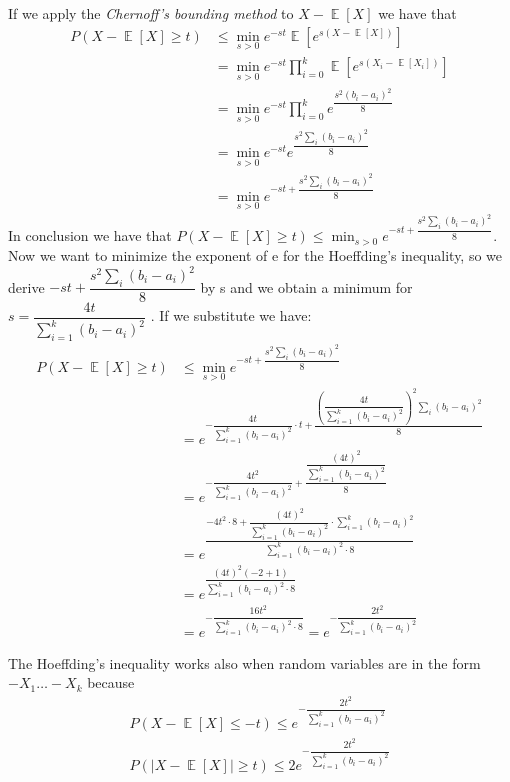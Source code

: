 \documentclass[10pt,a4paper]{book}
\DeclareMathOperator{\E}{\mathbb{E}}
\begin{document}
		If we apply the \textit{Chernoff's bounding method} to $ X - \E \left[X\right] $ we have that \\
		\begin{align*}
			P(X - \E \left[ X\right]  \geq t)  &\leq \min_{s > 0} e^{-st} \E \left[ e^{s(X - \E \left[X\right])} \right] \\
			& =\min_{s > 0} e^{-st} \prod_{i=0}^{k} \E \left[ e^{s(X_i - \E \left[X_i\right])} \right] \\
			& = \min_{s > 0} e^{-st} \prod_{i=0}^{k} e^{\dfrac{s^2(b_i - a_i)^2}{8}} \\
			&=  \min_{s > 0}  e^{-st}  e^{\dfrac{s^2\sum_i (b_i - a_i)^2}{8}} \\
			&= \min_{s > 0} e^{-st + \dfrac{s^2\sum_i (b_i - a_i)^2}{8}}
		\end{align*}
		In conclusion we have that $ 	P(X - \E \left[ X\right]  \geq t)  \leq  \min_{s > 0} e^{-st + \dfrac{s^2\sum_i (b_i - a_i)^2}{8}} $.
		Now we want to minimize the exponent of e for the Hoeffding's inequality, so we derive $ -st + \dfrac{s^2\sum_i (b_i - a_i)^2}{8} $ by s and we obtain a minimum for $ s = \dfrac{4t}{\sum_{i=1}^{k}(b_i - a_i)^2} $ .
		If we substitute we have:
		\begin{align*}
		P(X - \E \left[ X\right]  \geq t) & \leq  \min_{s > 0} e^{-st + \dfrac{s^2\sum_i (b_i - a_i)^2}{8}} \\
		&= e^{-\dfrac{4t}{\sum_{i=1}^{k}(b_i - a_i)^2} \cdot t + \dfrac{\left(\dfrac{4t}{\sum_{i=1}^{k}(b_i - a_i)^2} \right)^2\sum_i (b_i - a_i)^2}{8}} \\
		&=e^{-\dfrac{4t^2}{\sum_{i=1}^{k}(b_i - a_i)^2} + \dfrac{\dfrac{\left(4t\right)^2}{\sum_{i=1}^{k}(b_i - a_i)^2} }{8}} \\
		&= e^{\dfrac{-4t^2 \cdot 8 + \dfrac{\left(4t\right)^2}{\sum_{i=1}^{k}(b_i - a_i)^2} \cdot \sum_{i=1}^{k}(b_i - a_i)^2 }{\sum_{i=1}^{k}(b_i - a_i)^2 \cdot 8}} \\
		&= e^{ \dfrac{(4t)^2(-2+1)}{ \sum_{i=1}^{k}(b_i - a_i)^2 \cdot 8} } \\
		&= e^{ - \dfrac{16t^2}{ \sum_{i=1}^{k}(b_i - a_i)^2 \cdot 8} } = e^{ - \dfrac{2t^2}{ \sum_{i=1}^{k}(b_i - a_i)^2} }
		\end{align*}
		
		The Hoeffding's inequality works also when random variables are in the form $ -X_1 \ldots -X_k $ because
		\begin{align*}
			P(X - \E\left[X\right] \leq -t) \leq e^{ - \dfrac{2t^2}{ \sum_{i=1}^{k}(b_i - a_i)^2} } \\
			P(|X - \E\left[X\right ]| \geq  t) \leq 2e^{ - \dfrac{2t^2}{ \sum_{i=1}^{k}(b_i - a_i)^2} } \\
		\end{align*}
\end{document}
